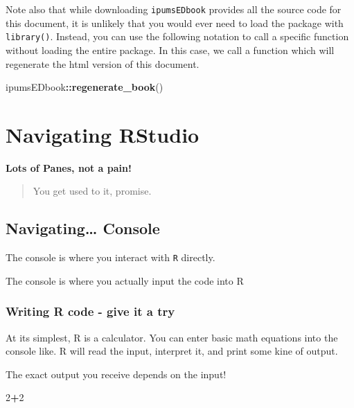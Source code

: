 \documentclass[
]{book}
\newenvironment{Shaded}{\begin{snugshade}}{\end{snugshade}}
\newcommand{\DecValTok}[1]{\textcolor[rgb]{0.00,0.00,0.81}{#1}}
\newcommand{\FunctionTok}[1]{\textcolor[rgb]{0.13,0.29,0.53}{\textbf{#1}}}
\newcommand{\NormalTok}[1]{#1}
\newcommand{\SpecialCharTok}[1]{\textcolor[rgb]{0.81,0.36,0.00}{\textbf{#1}}}
\begin{document}
Note also that while downloading \texttt{ipumsEDbook} provides all the source code for this document, it is unlikely that you would ever need to load the package with \texttt{library()}. Instead, you can use the following notation to call a specific function without loading the entire package. In this case, we call a function which will regenerate the html version of this document.

\begin{Shaded}
\begin{Highlighting}[]
\NormalTok{ipumsEDbook}\SpecialCharTok{::}\FunctionTok{regenerate\_book}\NormalTok{()}
\end{Highlighting}
\end{Shaded}

\hypertarget{navigating-rstudio}{%
\section*{Navigating RStudio}\label{navigating-rstudio}}

\textbf{Lots of Panes, not a pain!}

\begin{quote}
You get used to it, promise.
\end{quote}

\hypertarget{navigating-console}{%
\subsection{Navigating\ldots{} Console}\label{navigating-console}}

The console is where you interact with \texttt{R} directly.

The console is where you actually input the code into R

\hypertarget{writing-r-code---give-it-a-try}{%
\subsubsection{Writing R code - give it a try}\label{writing-r-code---give-it-a-try}}

At its simplest, R is a calculator. You can enter basic math equations into the console like. R will read the input, interpret it, and print some kine of output.

The exact output you receive depends on the input!

\begin{Shaded}
\begin{Highlighting}[]
\DecValTok{2}\SpecialCharTok{+}\DecValTok{2}
\end{Highlighting}
\end{Shaded}
\end{document}
